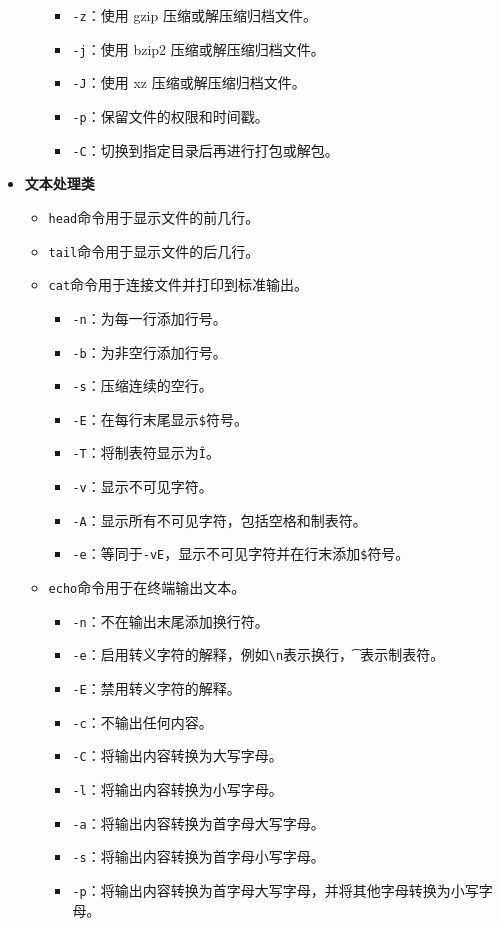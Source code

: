 \documentclass[../main.tex]{subfiles}
\begin{document}
\begin{itemize}
\begin{itemize}
\begin{itemize}
          \item \texttt{-z}：使用 gzip 压缩或解压缩归档文件。
          \item \texttt{-j}：使用 bzip2 压缩或解压缩归档文件。
          \item \texttt{-J}：使用 xz 压缩或解压缩归档文件。
          \item \texttt{-p}：保留文件的权限和时间戳。
          \item \texttt{-C}：切换到指定目录后再进行打包或解包。
        \end{itemize}
    \end{itemize}
  \item \textbf{文本处理类}
    \begin{itemize}
      \item \texttt{head}命令用于显示文件的前几行。
      \item \texttt{tail}命令用于显示文件的后几行。
      \item \texttt{cat}命令用于连接文件并打印到标准输出。
        \begin{itemize}
          \item \texttt{-n}：为每一行添加行号。
          \item \texttt{-b}：为非空行添加行号。
          \item \texttt{-s}：压缩连续的空行。
          \item \texttt{-E}：在每行末尾显示\texttt{\$}符号。
          \item \texttt{-T}：将制表符显示为\texttt{\^I}。
          \item \texttt{-v}：显示不可见字符。
          \item \texttt{-A}：显示所有不可见字符，包括空格和制表符。
          \item \texttt{-e}：等同于\texttt{-vE}，显示不可见字符并在行末添加\texttt{\$}符号。
        \end{itemize}
      \item \texttt{echo}命令用于在终端输出文本。
        \begin{itemize}
          \item \texttt{-n}：不在输出末尾添加换行符。
          \item \texttt{-e}：启用转义字符的解释，例如\texttt{\textbackslash n}表示换行，\texttt{\t}表示制表符。
          \item \texttt{-E}：禁用转义字符的解释。
          \item \texttt{-c}：不输出任何内容。
          \item \texttt{-C}：将输出内容转换为大写字母。
          \item \texttt{-l}：将输出内容转换为小写字母。
          \item \texttt{-a}：将输出内容转换为首字母大写字母。
          \item \texttt{-s}：将输出内容转换为首字母小写字母。
          \item \texttt{-p}：将输出内容转换为首字母大写字母，并将其他字母转换为小写字母。
        \end{itemize}
    \end{itemize}
\end{itemize}
\end{document}
